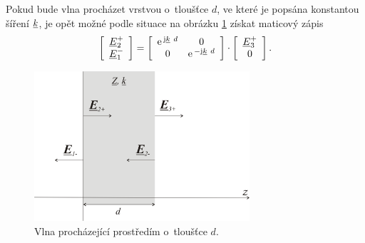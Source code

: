 Pokud bude vlna procházet vrstvou o~tloušťce $d$, ve které je popsána konstantou šíření ${\underline{k}}$, je opět možné podle situace na obrázku \ref{obr:evlny_maticova_metoda2} získat maticový zápis
\begin{equation}
\left[ \begin{array}{c}
{\underline{E}}_{2}^{+} \\
{\underline{E}}_{1}^{-} \\
\end{array} \right]
=
\left[ \begin{array}{cc}
\mathrm{e\,}^{\mathrm{j}{\underline{k}}~d} & 0 \\
0 & \mathrm{e\,}^{-\mathrm{j}{\underline{k}}~d} \\
\end{array} \right]
\cdot
\left[ \begin{array}{c}
{\underline{E}}_{3}^{+} \\
0 \\
\end{array} \right].
\label{rce:evlny_maticova_pruchod}
\end{equation}
\begin{figure}[!h]
	\centering
	\includegraphics[width=8cm]{evlny_maticova_metoda2.png}
	\caption{Vlna procházející prostředím o~tloušťce $d$. \cite{emp}}
	\label{obr:evlny_maticova_metoda2}
\end{figure}

